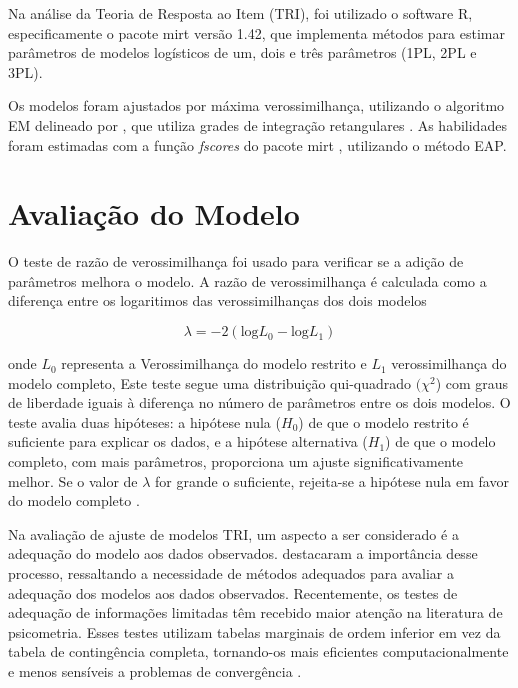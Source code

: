 Na análise da Teoria de Resposta ao Item (TRI), foi utilizado o software R, especificamente o pacote mirt \cite{mirt} versão 1.42, que implementa métodos para estimar parâmetros de modelos logísticos de um, dois e três parâmetros (1PL, 2PL e 3PL).


Os modelos foram ajustados por máxima verossimilhança, utilizando o algoritmo EM delineado por , que utiliza grades de integração retangulares \cite{mirt2024}. 
As habilidades foram estimadas com a função \textit{fscores} do pacote mirt \cite{mirt}, utilizando o método EAP.

\begin{comment}
	Inicialmente, foram ajustados modelos de 1, 2 e 3 parâmetros logísticos para os itens do teste, visando avaliar a qualidade dos itens e a adequação dos modelos aos dados. O modelo de 1 parâmetro (1PL) estima apenas a dificuldade dos itens, enquanto o modelo de 2 parâmetros (2PL) incorpora a discriminação, e o modelo de 3 parâmetros (3PL) adiciona o parâmetro de acerto casual.
\end{comment}




\section{Avaliação do Modelo}

O teste de razão de verossimilhança foi usado para verificar se a adição de parâmetros melhora o modelo. A razão de verossimilhança é calculada como a diferença entre os logaritimos das verossimilhanças dos dois modelos

\[
	\lambda = -2 (\text{log} L_0 - \text{log} L_1)
\]

onde $L_0$ representa a Verossimilhança do modelo restrito e
$L_1$ verossimilhança do modelo completo, Este teste segue uma distribuição qui-quadrado $(\chi^2$) com graus de liberdade iguais à diferença no número de parâmetros entre os dois modelos. O teste avalia duas hipóteses: a hipótese nula ($H_0$) de que o modelo restrito é suficiente para explicar os dados, e a hipótese alternativa ($H_1$) de que o modelo completo, com mais parâmetros, proporciona um ajuste significativamente melhor. Se o valor de $\lambda$ for grande o suficiente, rejeita-se a hipótese nula em favor do modelo completo \cite{casella2010inferencia}. 

Na avaliação de ajuste de modelos TRI, um aspecto a ser considerado é a adequação do modelo aos dados observados.  destacaram a importância desse processo, ressaltando a necessidade de métodos adequados para avaliar a adequação dos modelos aos dados observados. Recentemente, os testes de adequação de informações limitadas têm recebido maior atenção na literatura de psicometria. Esses testes utilizam tabelas marginais de ordem inferior em vez da tabela de contingência completa, tornando-os mais eficientes computacionalmente e menos sensíveis a problemas de convergência \cite{maydeu2014assessing}.

